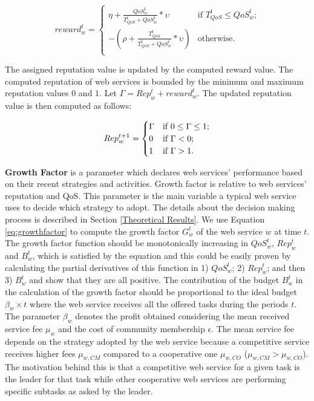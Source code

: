 \documentclass[runningheads,a4paper]{llncs}
\begin{document}
\begin{equation} \label{repr}
reward_w^t= \begin{cases}
\eta + \frac{QoS_w^t}{T_{QoS}^t+QoS_w^t} * \upsilon  & \text{if $T_{QoS}^t\leq QoS_w^t$;}\\
-(\rho + \frac{T_{QoS}^t}{T_{QoS}^t+QoS_w^t} * \upsilon) & \text{otherwise.}\\
\end{cases}
\end{equation}

The assigned reputation value is updated by the computed reward
value. The computed reputation of web services is bounded by the
minimum and maximum reputation values $0$ and $1$. %
Let $\Gamma = Rep_{w}^{t} + reward_w^t$. The updated reputation
value is then computed as follows:

\begin{equation}\label{repz}
Rep_{w}^{t+1} = \begin{cases}

\Gamma & \text{if $ 0 \leq \Gamma \leq 1$;}\\
0  & \text{if $\Gamma < 0$;}\\
1 & \text{if $\Gamma > 1$.}\\
\end{cases}
\end{equation}

\textbf{Growth Factor} is a parameter which declares web services'
performance based on their recent strategies and activities.
Growth factor is relative to web services' reputation and QoS.
This parameter is the main variable a typical web service uses to
decide which strategy to adopt. The details about the decision
making process is described in Section \ref{Theoretical Results}.
We use Equation \ref{eq:growthfactor} to compute the growth factor
$G^t_w$ of the web service $w$ at time $t$. The growth factor
function should be monotonically increasing in $QoS_w^t$,
$Rep^t_w$ and $B_w^t$, which is satisfied by the equation and this
could be easily proven by calculating the partial derivatives of
this function in 1) $QoS_w^t$; 2) $Rep^t_w$; and then 3) $B_w^t$
and show that they are all positive. The contribution of the
budget $B_w^t$ in the calculation of the growth factor should be
proportional to the ideal budget $\beta_w \times t$ where the web
service receives all the offered tasks during the periods $t$. The
parameter $\beta_w$ denotes the profit obtained considering the
mean received service fee $\mu_w$ and the cost of community
membership $\epsilon$. The mean service fee depends on the
strategy adopted by the web service because a competitive service
receives higher fees $\mu_{w, CM}$ compared to a cooperative one
$\mu_{w, CO}$ ($\mu_{w, CM} > \mu_{w, CO}$). The motivation behind
this is that a competitive web service for a given task is the
leader for that task while other cooperative web services are
performing specific subtasks as asked by the leader.
\end{document}
